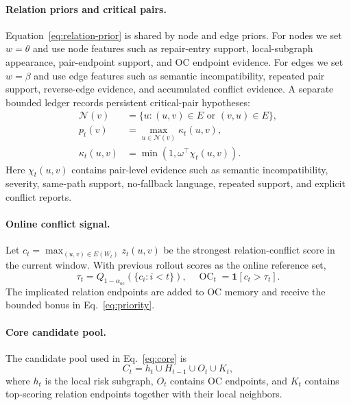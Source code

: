 \documentclass[11pt]{article}
\newcommand{\oc}{OC}
\begin{document}
\paragraph{Relation priors and critical pairs.}
Equation~\ref{eq:relation-prior} is shared by node and edge priors.  For nodes we set $w=\theta$ and use node features such as repair-entry support, local-subgraph appearance, pair-endpoint support, and \oc{} endpoint evidence.  For edges we set $w=\beta$ and use edge features such as semantic incompatibility, repeated pair support, reverse-edge evidence, and accumulated conflict evidence.  A separate bounded ledger records persistent critical-pair hypotheses:
\begin{equation}
    \begin{aligned}
    \mathcal{N}(v)&=\{u:(u,v)\in E \text{ or } (v,u)\in E\},\\
    p_t(v)&=\max_{u\in\mathcal{N}(v)} \kappa_t(u,v),\\
    \kappa_t(u,v)&=\min(1,\omega^\top\chi_t(u,v)).
    \end{aligned}
    \label{eq:critical-pair}
\end{equation}
Here $\chi_t(u,v)$ contains pair-level evidence such as semantic incompatibility, severity, same-path support, no-fallback language, repeated support, and explicit conflict reports.

\paragraph{Online conflict signal.}
Let $c_t=\max_{(u,v)\in E(W_t)} z_t(u,v)$ be the strongest relation-conflict score in the current window.  With previous rollout scores as the online reference set,
\begin{equation}
    \tau_t = Q_{1-\alpha_{\mathrm{oc}}}\left(\{c_i: i<t\}\right),
    \quad
    \operatorname{OC}_t=\mathbf{1}[c_t>\tau_t].
    \label{eq:oc-rule}
\end{equation}
The implicated relation endpoints are added to \oc{} memory and receive the bounded bonus in Eq.~\ref{eq:priority}.

\paragraph{Core candidate pool.}
The candidate pool used in Eq.~\ref{eq:core} is
\begin{equation}
    C_t = h_t \cup H_{t-1} \cup O_t \cup K_t,
    \label{eq:candidate-pool}
\end{equation}
where $h_t$ is the local risk subgraph, $O_t$ contains \oc{} endpoints, and $K_t$ contains top-scoring relation endpoints together with their local neighbors.
\end{document}

